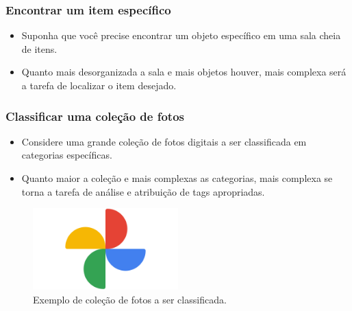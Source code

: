 \documentclass[10pt]{beamer}
\begin{document}
\begin{frame}
    \frametitle{Encontrar um item específico}
    \begin{itemize}\large
        \item Suponha que você precise encontrar um objeto específico em uma sala cheia de itens.
        \item Quanto mais desorganizada a sala e mais objetos houver, mais complexa será a tarefa de localizar o item desejado.
    \end{itemize}
\end{frame}

\begin{frame}
    \frametitle{Classificar uma coleção de fotos}

    \begin{itemize}
        \item Considere uma grande coleção de fotos digitais a ser classificada em categorias específicas.
        \item Quanto maior a coleção e mais complexas as categorias, mais complexa se torna a tarefa de análise e atribuição de tags apropriadas.
    \end{itemize}

    \begin{figure}[htb]
        \centering
        \includegraphics[width=0.5\textwidth]{fotos.jpg}
        \caption{Exemplo de coleção de fotos a ser classificada.}
        \label{fig:fotos}
    \end{figure}
\end{frame}
\end{document}

